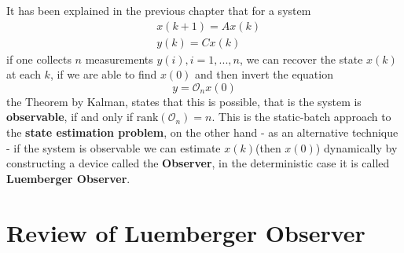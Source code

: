 It has been explained in the previous chapter that for a system 
\begin{equation} \label{eq:system}
	\begin{aligned}
		&x(k+1)=Ax(k)\\
		&y(k)=Cx(k)
	\end{aligned}
\end{equation}
if one collects $n$ measurements $y(i), i=1,..., n$, we can recover the state $x(k)$ at each $k$, if we are able to find $x(0)$ and then invert the equation
\begin{equation*}
	y = \mathcal{O}_n x(0)
\end{equation*}
the Theorem by Kalman, states that this is possible, that is the system is \textbf{observable}, if and only if $\text{rank}(\mathcal{O}_n)=n$.
This is the static-batch approach to the \textbf{state estimation problem}, on the other hand - as an alternative technique - if the system is observable we can estimate $x(k)$(then $x(0)$) dynamically by constructing a device called the \textbf{Observer}, in the deterministic case it is called \textbf{Luemberger Observer}.\\

\section{Review of Luemberger Observer}

